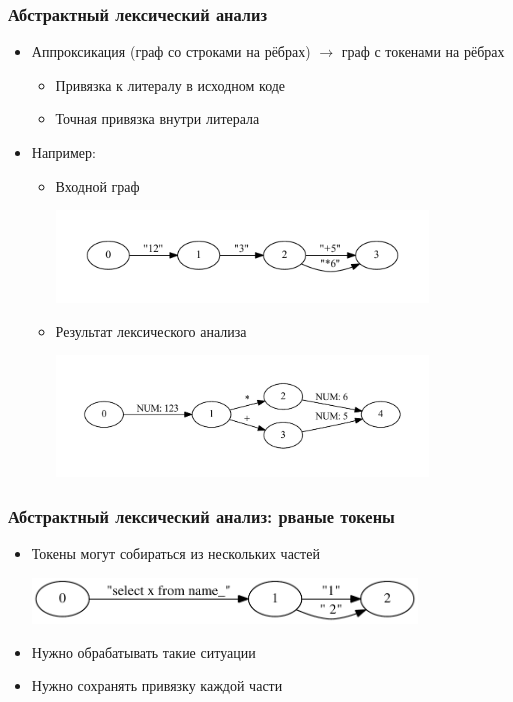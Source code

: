\documentclass{beamer}
\begin{document}
\begin{frame}[fragile]
	\transwipe[direction=90]
	\frametitle{Абстрактный лексический анализ}
    \begin{itemize}
    	\item Аппроксикация (граф со строками на рёбрах) $\rightarrow$ граф с токенами на рёбрах
    	\begin{itemize}
    	    \item Привязка к литералу в исходном коде
    	    \item Точная привязка внутри литерала
    	\end{itemize}
    	\item Например:
	    	\begin{itemize}
    	    \item Входной граф
                \begin{center}
                    \includegraphics[width=280pt]{picts/example_calc_break.pdf}
                \end{center}
    	    \item Результат лексического анализа
                \begin{center}
                    \includegraphics[width=280pt]{picts/res_ex_calc_break.pdf}
                \end{center}
    	\end{itemize}
	\end{itemize}
\end{frame}

\begin{frame}[fragile]
	\transwipe[direction=90]
	\frametitle{Абстрактный лексический анализ: рваные токены}
	\begin{itemize}
    	\item Токены могут собираться из нескольких частей
	        \begin{center}
	            \includegraphics[width=290pt]{picts/brackingLiterals.pdf}
	        \end{center}
    	\item Нужно обрабатывать такие ситуации
    	\item Нужно сохранять привязку каждой части
	\end{itemize}
	
\end{frame}
\end{document}
